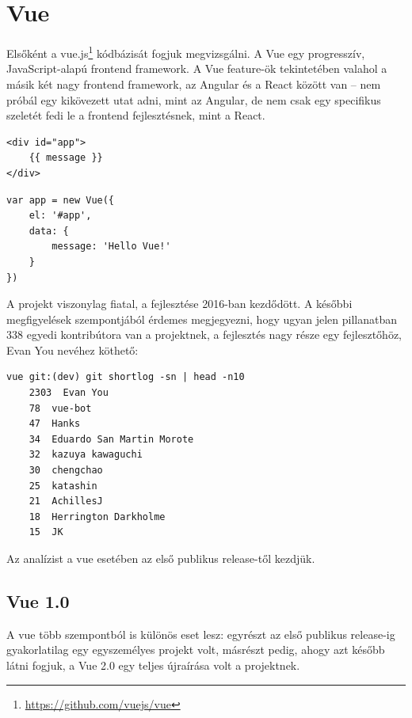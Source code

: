 \section{Vue}

Elsőként a vue.js\footnote{\url{https://github.com/vuejs/vue}} kódbázisát fogjuk megvizsgálni. A Vue egy progresszív, JavaScript-alapú frontend framework. A Vue feature-ök tekintetében valahol a másik két nagy frontend framework, az Angular és a React között van -- nem próbál egy kikövezett utat adni, mint az Angular, de nem csak egy specifikus szeletét fedi le a frontend fejlesztésnek, mint a React.

\begin{lstlisting}
<div id="app">
    {{ message }}
</div>
\end{lstlisting}

\begin{lstlisting}
var app = new Vue({
    el: '#app',
    data: {
        message: 'Hello Vue!'
    }
})
\end{lstlisting}

A projekt viszonylag fiatal, a fejlesztése 2016-ban kezdődött. A későbbi megfigyelések szempontjából érdemes megjegyezni, hogy ugyan jelen pillanatban 338 egyedi kontribútora van a projektnek, a fejlesztés nagy része egy fejlesztőhöz, Evan You nevéhez köthető:

\begin{lstlisting}
vue git:(dev) git shortlog -sn | head -n10
    2303  Evan You
    78  vue-bot
    47  Hanks
    34  Eduardo San Martin Morote
    32  kazuya kawaguchi
    30  chengchao
    25  katashin
    21  AchillesJ
    18  Herrington Darkholme
    15  JK
\end{lstlisting}\label{code:vue-authors}

Az analízist a vue esetében az első publikus release-től kezdjük.

\subsection{Vue 1.0}

A vue több szempontból is különös eset lesz: egyrészt az első publikus release-ig gyakorlatilag egy egyszemélyes projekt volt, másrészt pedig, ahogy azt később látni fogjuk, a Vue 2.0 egy teljes újraírása volt a projektnek.

